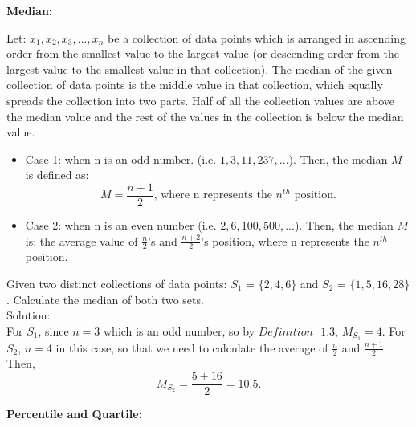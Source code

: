 \textbf{Median:}

\begin{definition}
Let: $x_1, x_2, x_3, ... , x_n$ be a collection of data points which is arranged in ascending order from the smallest value to the largest value (or descending order from the largest value to the smallest value in that collection). The median of the given collection of data points is the middle value in that collection, which equally spreads the collection into two parts. Half of all the collection values are above the median value and the rest of the values in the collection is below the median value.
\begin{itemize}
	\item Case 1: when n is an odd number. (i.e. $1, 3, 11, 237,...$). Then, the median $M$ is defined as: \[ M = \frac{n+1}{2} \text{, where n represents the $n^{th}$ position}.\]
	\item Case 2: when n is an even number (i.e. $2, 6, 100, 500,...$). Then, the median $M$ is: the average value of $\frac{n}{2}$'s and $\frac{n+2}{2}$'s position, where n represents the $n^{th}$ position.
	\end{itemize}
\end{definition}

\begin{example}
Given two distinct collections of data points: $S_1$ = $\{2, 4, 6\}$ and $S_2$ = $\{1, 5, 16, 28\}$. Calculate the median of both two sets.\\


Solution: \\

For $S_1$, since $n = 3$ which is an odd number, so by $Definition \text{ } 1.3$, $M_{S_1} = 4$. For $S_2$, $n = 4$ in this case, so that we need to calculate the average of $\frac{n}{2}$ and $\frac{n+1}{2}$. Then, \[ M_{S_2} = \frac{5+16}{2} = 10.5.\]
\end{example}

\textbf{Percentile and Quartile:}

